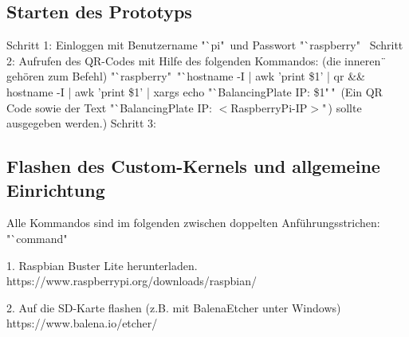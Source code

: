 \documentclass[12pt,a4paper,bibliography=totoc,listof=totoc]{scrartcl}
\begin{document}
\subsection{Starten des Prototyps}
Schritt 1:
Einloggen mit Benutzername "`pi"\ und Passwort "`raspberry"\
\newline
Schritt 2: Aufrufen des QR-Codes mit Hilfe des folgenden Kommandos: 
\newline(die inneren \"\, gehören zum Befehl)
\newline\newline
"`raspberry"\ "`hostname -I | awk '{print \$1}' | qr \&\& hostname -I | awk '{print \$1}' | xargs echo "`BalancingPlate IP: \$1"\,"\,
\newline\newline
    (Ein QR Code sowie der Text "`BalancingPlate IP: $<$RaspberryPi-IP$>$"\,) sollte ausgegeben werden.)
\newline
Schritt 3:

\subsection{Flashen des Custom-Kernels und allgemeine Einrichtung}
Alle Kommandos sind im folgenden zwischen doppelten Anführungsstrichen: "`command"\,

1. Raspbian Buster Lite herunterladen.
   https://www.raspberrypi.org/downloads/raspbian/
\newline

2. Auf die SD-Karte flashen (z.B. mit BalenaEtcher unter Windows)\newline
   https://www.balena.io/etcher/
\newline
\end{document}
